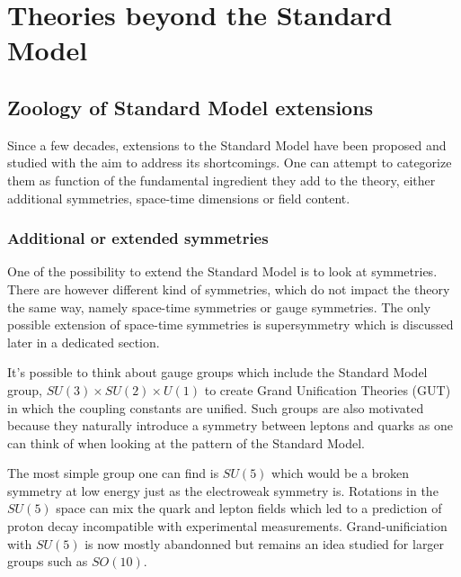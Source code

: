     \section{Theories beyond the Standard Model}

        \subsection{Zoology of Standard Model extensions}

        Since a few decades, extensions to the Standard Model have been proposed and
        studied with the aim to address its shortcomings. One can attempt to categorize
        them as function of the fundamental ingredient they add to the theory, either
        additional symmetries, space-time dimensions or field content.

            \subsubsection{Additional or extended symmetries}

        One of the possibility to extend the Standard Model is to look at symmetries.
        There are however different kind of symmetries, which do not impact the theory
        the same way, namely space-time symmetries or gauge symmetries. The only possible
        extension of space-time symmetries is supersymmetry which is discussed later
        in a dedicated section.

        It's possible to think about gauge groups which include the Standard Model group,
        $SU(3) \times SU(2) \times U(1)$ to create Grand Unification Theories (GUT) in which
        the coupling constants are unified. Such groups are also motivated because they
        naturally introduce a symmetry between leptons and quarks as one can think of
        when looking at the pattern of the Standard Model.

        The most simple group one can find is $SU(5)$ which would be a broken symmetry at
        low energy just as the electroweak symmetry is. Rotations in the $SU(5)$ space
        can mix the quark and lepton fields which led to a prediction of proton decay
        incompatible with experimental measurements. Grand-unificiation with $SU(5)$ is
        now mostly abandonned but remains an idea studied for larger groups such as $SO(10)$.

